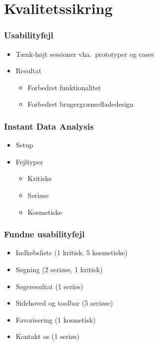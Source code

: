 \section{Kvalitetssikring}

\begin{frame}
	\frametitle{Usabilityfejl}
  \begin{itemize}
    \item Tænk-højt sessioner vha.\ prototyper og cases
    \item Resultat
    \begin{itemize}
      \item Forbedret funktionalitet
      \item Forbedret brugergrænsefladedesign
    \end{itemize}
  \end{itemize}
\end{frame}

\begin{frame}
	\frametitle{Instant Data Analysis}
  \begin{itemize}
	  \item Setup
    \item Fejltyper
      \begin{itemize}
        \item Kritiske
        \item Seriøse
        \item Kosmetiske
      \end{itemize}
  \end{itemize}
\end{frame}

\begin{frame}
	\frametitle{Fundne usabilityfejl}
    \begin{itemize}
	  \item Indkøbsliste (1 kritisk, 5 kosmetiske)
    \item Søgning (2 seriøse, 1 kritisk)
    \item Søgeresultat (1 seriøs)
    \item Sidehoved og toolbar (5 seriøse)
    \item Favorisering (1 kosmetisk)
    \item Kontakt os (1 seriøs)
  \end{itemize}
\end{frame}
